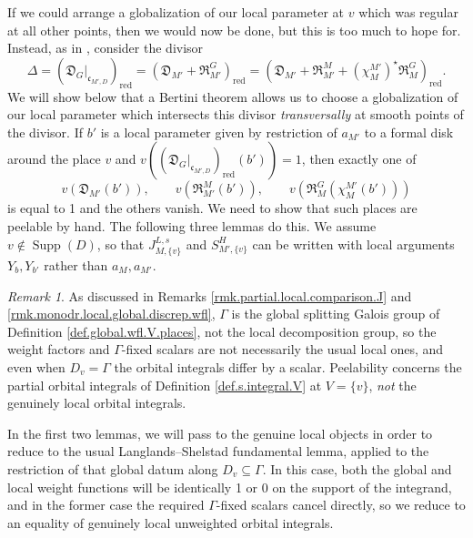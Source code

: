 \documentclass[openany]{amsbook}
\theoremstyle{definition}
\theoremstyle{remark}
\newtheorem{remark}[theorem]{Remark}
\numberwithin{equation}{section}
\newcommand{\red}{\mathrm{red}}
\renewcommand{\-}{\operatorname{-}}
\newcommand{\on}[1]{\operatorname{#1}}
\newcommand{\fc}{\mathfrak{c}}
\newcommand{\fD}{\mathfrak{D}}
\newcommand{\fR}{\mathfrak{R}}
\begin{document}
If we could arrange a globalization of our local parameter at $v$ which was regular at all other points, then we would now be done, but this is too much to hope for. Instead, as in \cite[\S 8.5]{ngofl}, consider the divisor 
$$
    \Delta = (\fD_G|_{\fc_{M',D}})_{\red} = (\fD_{M'} + \fR_{M'}^G)_{\red} = (\fD_{M'} + \fR_{M'}^M + (\chi_M^{M'})^\star\fR_{M}^G)_{\red}.
$$
We will show below that a Bertini theorem allows us to choose a globalization of our local parameter which intersects this divisor \emph{transversally} at smooth points of the divisor. If $b'$ is a local parameter given by restriction of $a_{M'}$ to a formal disk around the place $v$ and $v((\fD_G|_{\fc_{M',D}})_{\red}(b')) = 1$, then exactly one of
$$
    v(\fD_{M'}(b')), \qquad v(\fR_{M'}^M(b')), \qquad v(\fR_M^G(\chi^{M'}_M(b')))
$$
is equal to 1 and the others vanish. We need to show that such places are peelable by hand. The following three lemmas do this. We assume $v \not\in \on{Supp}(D)$, so that $J_{M, \{v\}}^{L,s}$ and $S_{M', \{v\}}^{H}$ can be written with local arguments $Y_b, Y_{b'}$ rather than $a_M, a_{M'}$.

\begin{remark}\label{rmk.transv.lemma.loc.global.discrep} As discussed in Remarks \ref{rmk.partial.local.comparison.J} and \ref{rmk.monodr.local.global.discrep.wfl}, $\Gamma$ is the global splitting Galois group of Definition \ref{def.global.wfl.V.places}, not the local decomposition group, so the weight factors and $\Gamma$-fixed scalars are not necessarily the usual local ones, and even when $D_v = \Gamma$ the orbital integrals differ by a scalar. Peelability concerns the partial orbital integrals of Definition \ref{def.s.integral.V} at $V = \{v\}$, \emph{not} the genuinely local orbital integrals. 

In the first two lemmas, we will pass to the genuine local objects in order to reduce to the usual Langlands--Shelstad fundamental lemma, applied to the restriction of that global datum along $D_v \subseteq \Gamma$. In this case, both the global and local weight functions will be identically 1 or 0 on the support of the integrand, and in the former case the required $\Gamma$-fixed scalars cancel directly, so we reduce to an equality of genuinely local unweighted orbital integrals.\end{remark}   
\end{document}
